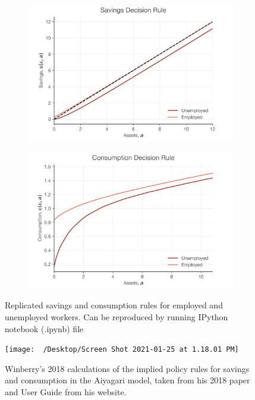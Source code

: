 \documentclass[11pt]{article}
\begin{document}
\begin{figure}[htp]
\begin{subfigure}{.5\textwidth}
\centering
\includegraphics[scale=.45]{../Figures/save_rule.png}

\end{subfigure}
\begin{subfigure}{.5\textwidth}
\centering
\includegraphics[scale=.45]{../Figures/cons_rule.png}
\end{subfigure}
\caption{Replicated savings and consumption rules for employed and unemployed workers. Can be reproduced by running IPython notebook (.ipynb) file  }
\label{con_sav_rep}
\vspace*{\floatsep}
\centering
\texttt{[image: ~/Desktop/Screen Shot 2021-01-25 at 1.18.01 PM]}
\caption{Winberry's 2018 calculations of the implied policy rules for savings and consumption in the Aiyagari model, taken from his 2018 paper and User Guide from his website.}
\label{con_sav_orig}
\end{figure}	
\end{document}
